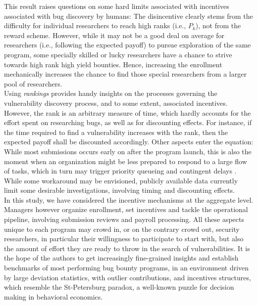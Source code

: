 This result raises questions on some hard limits associated with incentives associated with bug discovery by humans: The disincentive clearly stems from the difficulty for individual researchers to reach high ranks (i.e., $P_{k}$), not from the reward scheme. However, while it may not be a good deal on average for researchers (i.e., following the expected payoff) to pursue exploration of the same program, some specially skilled or lucky researchers have a chance to strive towards high rank high yield bounties. Hence, increasing the enrollment mechanically increases the chance to find those special researchers from a larger pool of researchers.\\

Using {\it rankings} provides handy insights on the processes governing the vulnerability discovery process, and to some extent, associated incentives. However, the rank is an arbitrary measure of time, which hardly accounts for the effort spent on researching bugs, as well as for discounting effects. For instance, if the time required to find a vulnerability increases with the rank, then the expected payoff shall be discounted accordingly. Other aspects enter the equation: While most submissions occurs early on after the program launch, this is also the moment when an organization might be less prepared to respond to a large flow of tasks, which in turn may trigger priority queueing and contingent delays \cite{maillart2011quantification}. While some workaround may be envisioned, publicly available data currently limit some desirable investigations, involving timing and discounting effects.\\

In this study, we have considered the incentive mechanisms at the aggregate level. Managers however organize enrollment, set incentives and tackle the operational pipeline, involving submission reviews and payroll processing. All these aspects unique to each program may crowd in, or on the contrary crowd out, security researchers, in particular their willingness to participate to start with, but also the amount of effort they are ready to throw in the search of vulnerabilities. It is the hope of the authors to get increasingly fine-grained insights and establish benchmarks of most performing bug bounty programs, in an environment driven by large deviation statistics, with outlier contributions, and incentives structures, which resemble the St-Petersburg paradox, a well-known puzzle for decision making in behavioral economics.
